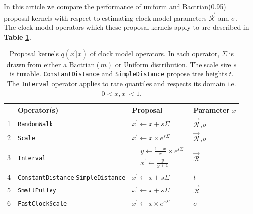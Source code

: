 \documentclass[10pt,letterpaper]{article}
\begin{document}
In this article we compare the performance of uniform and Bactrian(0.95) proposal kernels with respect to estimating clock model parameters $\vec{\mathcal{R}}^{\,}$ and $\sigma$. 
The clock model operators which these proposal kernels apply to are described in \textbf{Table \ref{table:bactriankernels}}.





\begin{table}[h!]
\centering
\begin{tabular}{|l| p{3cm} l l|} 
 \hline
 & Operator(s) & Proposal & Parameter $x$   \\
  \hline
 1 & \texttt{RandomWalk}  & $x^\prime \leftarrow x + s\Sigma$ & $\vec{\mathcal{R}}^{\,}, \sigma$  \\
  \hline
 2 & \texttt{Scale} & $x^\prime \leftarrow x \times e^{s\Sigma}$ & $\vec{\mathcal{R}}^{\,}, \sigma$   \\
  \hline
 3 & \texttt{Interval} & $\begin{array} {rl} &y \leftarrow \frac{1 - x}{x} \times e^{s\Sigma} \\ &x^\prime \leftarrow \frac{y}{y + 1}  \end{array}$ & $\vec{\mathcal{R}}^{\,}$  \\
  \hline
 4 & \texttt{ConstantDistance} \texttt{SimpleDistance} & $x^\prime \leftarrow x + s\Sigma$ & $t$ \\
 \hline
 5 & \texttt{SmallPulley} & $x^\prime \leftarrow x + s\Sigma$ & $\vec{\mathcal{R}}^{\,}$  \\
 \hline
6 & \texttt{FastClockScale}  & $x^\prime \leftarrow x \times e^{s\Sigma}$ & $\sigma$   \\
 \hline
\end{tabular}
\caption{Proposal kernels $q(x^\prime|x)$ of clock model operators.
 In each operator, $\Sigma$ is drawn from either a $\text{Bactrian}(m)$ or $\text{Uniform}$ distribution. 
 The scale size $s$ is tunable.
 \texttt{ConstantDistance} and \texttt{SimpleDistance} propose tree heights $t$.
  The \texttt{Interval} operator applies to rate quantiles and respects its domain i.e. $0 < x, x^\prime < 1$. }
\label{table:bactriankernels}
\end{table}





\end{document}
